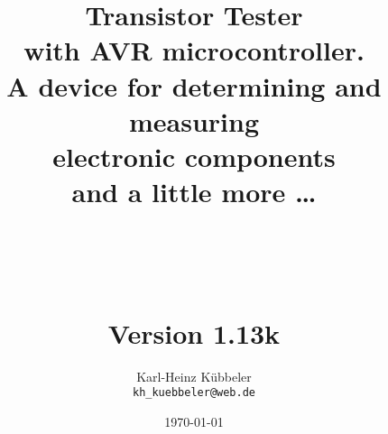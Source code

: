 \documentclass[pdftex,12pt,a4paper,oneside,english]{report}
\begin{document}
\begin{figure}[t]
\end{figure}

\newcommand\electricC {
\hspace{-10 pt}
\begin{circuitikz}
\draw (0,0) to[capacitor] (0:1);
\end{circuitikz}
\hspace{-6 pt}
}
\newcommand\electricR {
\hspace{-10 pt}
\begin{circuitikz}
\draw (0,0) to[european resistor] (0:1);
\end{circuitikz}
\hspace{-6 pt}
}
\newcommand\electricL {
\hspace{-10 pt}
\begin{circuitikz}
\draw (0,0) 
 to[american inductor] (-1,0) 
;\end{circuitikz}
\hspace{-6 pt}
}
\newcommand\electricDAK {
\begin{circuitikz}
\draw (0,0) to[full diode] (0:1);
\end{circuitikz}
}
\newcommand\electricDKA {
\begin{circuitikz}
\draw (0,0) to[full diode] (180:1);
\end{circuitikz}
}


\title{Transistor Tester \\
 with AVR microcontroller. \\
 A device for determining and measuring \\
 electronic components \\
 and a little more \dots \\
~\\
~\\
~\\
Version 1.13k \\
}
\author{Karl-Heinz K\"ubbeler\\
\texttt{kh\_kuebbeler@web.de}}
\date{\today}
\maketitle
\tableofcontents






\end{document}
